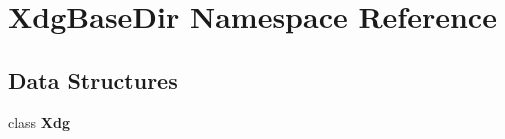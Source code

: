 \section{Xdg\+Base\+Dir Namespace Reference}
\label{namespace_xdg_base_dir}
\subsection*{Data Structures}
\begin{DoxyCompactItemize}
\item 
class {\bf Xdg}
\end{DoxyCompactItemize}
